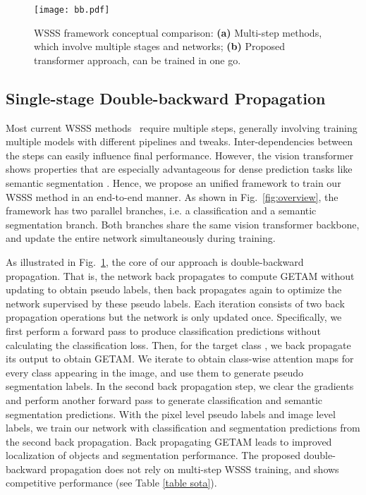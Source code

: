 \documentclass[10pt,twocolumn,letterpaper]{article}
\begin{document}
\begin{figure}[!t]
   \begin{center}
   {\texttt{[image: bb.pdf]}} 
   \end{center}
\caption{WSSS framework conceptual comparison: \textbf{(a)} Multi-step methods, which involve multiple stages and networks; \textbf{(b)} Proposed transformer approach, can be trained in one go. 
}
\label{fig:double bakcward}
\end{figure}

\subsection{Single-stage Double-backward Propagation}

Most current WSSS methods~\cite{wang2020self,chang2020weakly,zhang2020splitting,zhang2020reliability,guo2019mixup,yun2019cutmix,kim2021discriminative} require multiple steps, generally involving
training 
multiple models with
different pipelines and tweaks.
Inter-dependencies between the steps can easily influence final performance.
However,
the vision transformer shows properties that are especially advantageous for dense prediction tasks like semantic segmentation \cite{ranftl2021vision,liu2021swin,bao2021beit,wang2021pvtv2}. 
Hence, 
we propose an unified framework to train our WSSS method in an end-to-end manner.
As shown in Fig.~\ref{fig:overview},
the framework has two parallel branches, i.e. a classification and a semantic segmentation branch. 
Both branches share the same vision transformer backbone, and update the entire network simultaneously during training.










As illustrated in Fig.~\ref{fig:double bakcward}, 
the core of our approach is double-backward propagation. 
That is, the network back propagates to compute GETAM without updating to obtain pseudo labels, then back propagates again to optimize the network supervised by these pseudo labels. 
Each iteration consists of two back propagation operations but the network is only updated once.
Specifically, we first perform a forward pass to produce classification predictions  without calculating the classification loss.
Then, for the target class , we back propagate its output  to obtain GETAM.
We iterate to obtain class-wise attention maps for every class appearing in the image, and use them
to generate pseudo segmentation labels.
In the second back propagation step, we clear the gradients and perform another forward pass to generate classification and semantic segmentation predictions. With the pixel level pseudo labels and image level labels, we train our network with classification and segmentation predictions from the second back propagation.
Back propagating GETAM
leads to improved localization of objects and segmentation performance. 
The proposed double-backward propagation does not rely on
multi-step WSSS training, and shows competitive performance (see Table \ref{table sota}).
\end{document}
